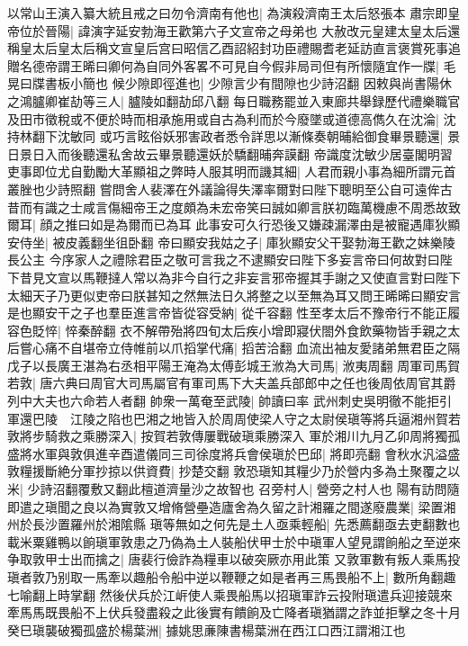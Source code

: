 以常山王演入纂大統且戒之曰勿令濟南有他也|{
	為演殺濟南王太后怒張本}
肅宗即皇帝位於晉陽|{
	諱演字延安勃海王歡第六子文宣帝之母弟也}
大赦改元皇建太皇太后還稱皇太后皇太后稱文宣皇后宫曰昭信乙酉詔紹封功臣禮賜耆老延訪直言褒賞死事追贈名德帝謂王晞曰卿何為自同外客畧不可見自今假非局司但有所懷隨宜作一牒|{
	毛晃曰牒書板小簡也}
候少隙即徑進也|{
	少隙言少有間隙也少詩沼翻}
因敕與尚書陽休之鴻臚卿崔劼等三人|{
	臚陵如翻劼邱八翻}
每日職務罷並入東廊共舉録歷代禮樂職官及田市徵稅或不便於時而相承施用或自古為利而於今廢墜或道德高儁久在沈淪|{
	沈持林翻下沈敏同}
或巧言眩俗妖邪害政者悉令詳思以漸條奏朝晡給御食畢景聽還|{
	景日景日入而後聽還私舍故云畢景聽還妖於驕翻晡奔謨翻}
帝識度沈敏少居臺閣明習吏事即位尤自勤勵大革顯祖之弊時人服其明而譏其細|{
	人君而親小事為細所謂元首叢脞也少詩照翻}
嘗問舍人裴澤在外議論得失澤率爾對曰陛下聰明至公自可遠侔古昔而有識之士咸言傷細帝王之度頗為未宏帝笑曰誠如卿言朕初臨萬機慮不周悉故致爾耳|{
	顔之推曰如是為爾而已為耳}
此事安可久行恐後又嫌疎漏澤由是被寵遇庫狄顯安侍坐|{
	被皮義翻坐徂卧翻}
帝曰顯安我姑之子|{
	庫狄顯安父干娶勃海王歡之妹樂陵長公主}
今序家人之禮除君臣之敬可言我之不逮顯安曰陛下多妄言帝曰何故對曰陛下昔見文宣以馬鞭撻人常以為非今自行之非妄言邪帝握其手謝之又使直言對曰陛下太細天子乃更似吏帝曰朕甚知之然無法日久將整之以至無為耳又問王晞晞曰顯安言是也顯安干之子也羣臣進言帝皆從容受納|{
	從千容翻}
性至孝太后不豫帝行不能正履容色貶悴|{
	悴秦醉翻}
衣不解帶殆將四旬太后疾小增即寢伏閤外食飲藥物皆手親之太后嘗心痛不自堪帝立侍帷前以爪搯掌代痛|{
	搯苦洽翻}
血流出袖友愛諸弟無君臣之隔戊子以長廣王湛為右丞相平陽王淹為太傅彭城王浟為大司馬|{
	浟夷周翻}
周軍司馬賀若敦|{
	唐六典曰周官大司馬屬官有軍司馬下大夫盖兵部郎中之任也後周依周官其爵列中大夫也六命若人者翻}
帥衆一萬奄至武陵|{
	帥讀曰率}
武州刺史吳明徹不能拒引軍還巴陵　江陵之陷也巴湘之地皆入於周周使梁人守之太尉侯瑱等將兵逼湘州賀若敦將步騎救之乘勝深入|{
	按賀若敦傳屢戰破瑱乘勝深入}
軍於湘川九月乙卯周將獨孤盛將水軍與敦俱進辛酉遣儀同三司徐度將兵會侯瑱於巴邱|{
	將即亮翻}
會秋水汎溢盛敦糧援斷絶分軍抄掠以供資費|{
	抄楚交翻}
敦恐瑱知其糧少乃於營内多為土聚覆之以米|{
	少詩沼翻覆敷又翻此檀道濟量沙之故智也}
召旁村人|{
	營旁之村人也}
陽有訪問隨即遣之瑱聞之良以為實敦又增脩營壘造廬舍為久留之計湘羅之間遂廢農業|{
	梁置湘州於長沙置羅州於湘隂縣}
瑱等無如之何先是土人亟乘輕船|{
	先悉薦翻亟去吏翻數也}
載米粟雞鴨以餉瑱軍敦患之乃偽為土人裝船伏甲士於中瑱軍人望見謂餉船之至逆來争取敦甲士出而擒之|{
	唐裴行儉詐為糧車以破突厥亦用此策}
又敦軍數有叛人乘馬投瑱者敦乃别取一馬牽以趣船令船中逆以鞭鞭之如是者再三馬畏船不上|{
	數所角翻趣七喻翻上時掌翻}
然後伏兵於江㟁使人乘畏船馬以招瑱軍詐云投附瑱遣兵迎接競來牽馬馬既畏船不上伏兵發盡殺之此後實有饋餉及亡降者瑱猶謂之詐並拒擊之冬十月癸巳瑱襲破獨孤盛於楊葉洲|{
	據姚思亷陳書楊葉洲在西江口西江謂湘江也}
